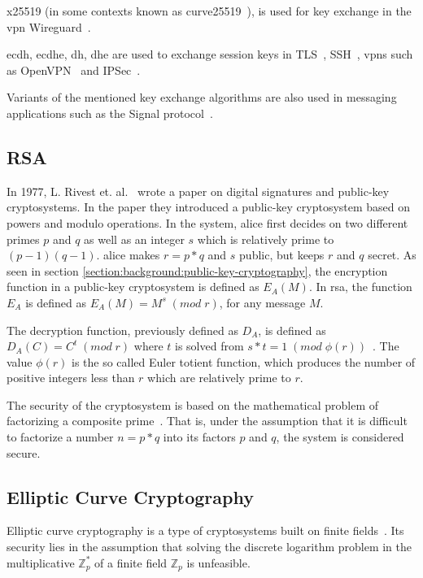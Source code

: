 \gls{x25519} (in some contexts known as \gls{curve25519}~\cite{25519naming}), is used for key exchange in the \gls{vpn} Wireguard~\cite{wireguard2020}.

\gls{ecdh}, \gls{ecdhe}, \gls{dh}, \gls{dhe} are used to exchange session keys in TLS~\cite{rfc8446}, SSH~\cite{williams2011}, \glspl{vpn} such as OpenVPN~\cite{openvpn} and IPSec~\cite{rfc2409}.

Variants of the mentioned key exchange algorithms are also used in messaging applications such as the Signal protocol~\cite{gordon2017}.

\subsection{RSA}

In 1977, L. Rivest et. al.~\cite{rsa1977} wrote a paper on digital signatures and public-key cryptosystems. In the paper they introduced a public-key cryptosystem based on powers and modulo operations. In the system, \gls{alice} first decides on two different primes $p$ and $q$ as well as an integer $s$ which is relatively prime to $(p-1)(q-1)$. \gls{alice} makes $r=p*q$ and $s$ public, but keeps $r$ and $q$ secret. As seen in section \ref{section:background:public-key-cryptography}, the encryption function in a public-key cryptosystem is defined as $E_A(M)$. In \gls{rsa}, the function $E_A$ is defined as $E_A(M)=M^s\;(mod\;r)$, for any message $M$.

The decryption function, previously defined as $D_A$, is defined as $D_A(C)=C^t\;(mod\;r)$ where $t$ is solved from $s*t=1\;(mod\;\phi(r))$~\cite{rsa1977}. The value $\phi(r)$ is the so called Euler totient function, which produces the number of positive integers less than $r$ which are relatively prime to $r$.

The security of the cryptosystem is based on the mathematical problem of factorizing a composite prime~\cite{rsa1977}. That is, under the assumption that it is difficult to factorize a number $n=p*q$ into its factors $p$ and $q$, the system is considered secure.

\subsection{Elliptic Curve Cryptography}

Elliptic curve cryptography is a type of cryptosystems built on finite fields~\cite{delfs2007}. Its security lies in the assumption that solving the discrete logarithm problem in the multiplicative $\mathbb{Z}_p^*$ of a finite field $\mathbb{Z}_p$ is unfeasible.

